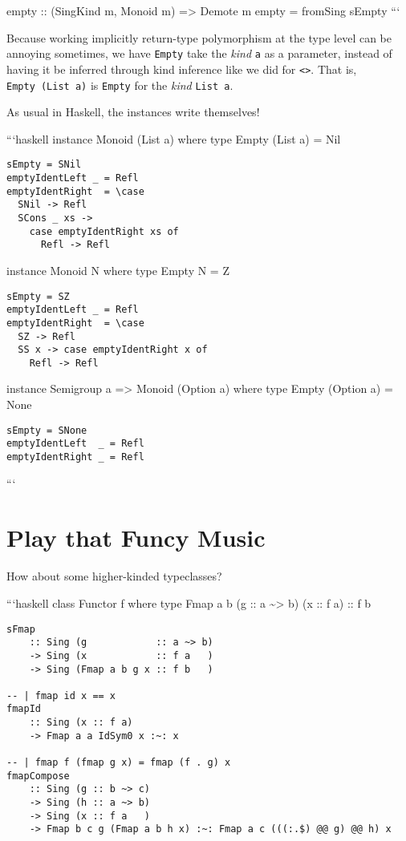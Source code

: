 \documentclass[]{article}
\begin{document}
empty :: (SingKind m, Monoid m) =\textgreater{} Demote m empty = fromSing sEmpty
```

Because working implicitly return-type polymorphism at the type level can be
annoying sometimes, we have \texttt{Empty} take the \emph{kind} \texttt{a} as a
parameter, instead of having it be inferred through kind inference like we did
for \texttt{\textless{}\textgreater{}}. That is, \texttt{Empty\ (List\ a)} is
\texttt{Empty} for the \emph{kind} \texttt{List\ a}.

As usual in Haskell, the instances write themselves!

```haskell instance Monoid (List a) where type Empty (List a) = Nil

\begin{verbatim}
sEmpty = SNil
emptyIdentLeft _ = Refl
emptyIdentRight  = \case
  SNil -> Refl
  SCons _ xs ->
    case emptyIdentRight xs of
      Refl -> Refl
\end{verbatim}

instance Monoid N where type Empty N = Z

\begin{verbatim}
sEmpty = SZ
emptyIdentLeft _ = Refl
emptyIdentRight  = \case
  SZ -> Refl
  SS x -> case emptyIdentRight x of
    Refl -> Refl
\end{verbatim}

instance Semigroup a =\textgreater{} Monoid (Option a) where type Empty (Option
a) = None

\begin{verbatim}
sEmpty = SNone
emptyIdentLeft  _ = Refl
emptyIdentRight _ = Refl
\end{verbatim}

```

\section{Play that Funcy Music}

How about some higher-kinded typeclasses?

```haskell class Functor f where type Fmap a b (g :: a
\textasciitilde{}\textgreater{} b) (x :: f a) :: f b

\begin{verbatim}
sFmap
    :: Sing (g            :: a ~> b)
    -> Sing (x            :: f a   )
    -> Sing (Fmap a b g x :: f b   )

-- | fmap id x == x
fmapId
    :: Sing (x :: f a)
    -> Fmap a a IdSym0 x :~: x

-- | fmap f (fmap g x) = fmap (f . g) x
fmapCompose
    :: Sing (g :: b ~> c)
    -> Sing (h :: a ~> b)
    -> Sing (x :: f a   )
    -> Fmap b c g (Fmap a b h x) :~: Fmap a c (((:.$) @@ g) @@ h) x
\end{verbatim}
\end{document}

